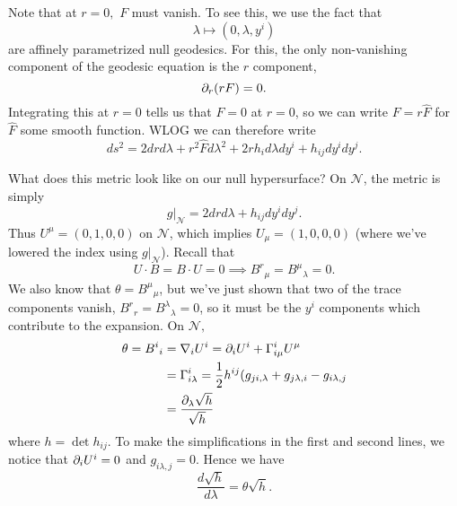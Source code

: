 Note that at $r=0,$ $F$ must vanish. To see this, we use the fact that
\begin{equation}
     \lambda\mapsto (0,\lambda,y^i)
\end{equation}
are affinely parametrized null geodesics. For this, the only non-vanishing component of the geodesic equation is the $r$ component,
\begin{equation}
    \partial_r (rF)=0.
\end{equation}
Integrating this at $r=0$ tells us that $F=0$ at $r=0$, so we can write $F=r\hat F$ for $\hat F$ some smooth function. WLOG we can therefore write
\begin{equation}
    ds^2 = 2drd\lambda +r^2 \hat F d\lambda^2 +2rh_i d\lambda dy^i + h_{ij} dy^i dy^j.
\end{equation}

What does this metric look like on our null hypersurface? On $\mathcal{N}$, the metric is simply
\begin{equation}\label{nullhsurfacemetric}
    g|_{\mathcal{N}}= 2drd\lambda +h_{ij} dy^i dy^j.
\end{equation}
Thus $U^\mu=(0,1,0,0)$ on $\mathcal{N}$, which implies $U_\mu=(1,0,0,0)$ (where we've lowered the index using $g|_{\mathcal{N}}$). Recall that 
\begin{equation}
    U\cdot B = B\cdot U=0 \implies B^r{}_\mu = B^\mu{}_\lambda = 0.
\end{equation}
We also know that $\theta=B^\mu{}_\mu$, but we've just shown that two of the trace components vanish, $B^r{}_r=B^\lambda{}_\lambda=0$, so it must be the $y^i$ components which contribute to the expansion. On $\mathcal{N},$
\begin{align}
    \theta = B^i{}_i &=\nabla_i U^i = \partial_i U^i +\Gamma^i_{i\mu} U^\mu\\
    &= \Gamma^i_{i \lambda} =\frac{1}{2} h^{ij}(g_{ji,\lambda} + g_{j\lambda,i}-g_{i\lambda,j}\\
    &= \frac{\partial_\lambda\sqrt{h}}{\sqrt{h}}
\end{align}
where $h=\det h_{ij}$. To make the simplifications in the first and second lines, we notice that $\partial_i U^i=0$ and $g_{i\lambda,j}=0$. Hence we have
\begin{equation}
    \frac{d\sqrt{h}}{d\lambda} = \theta \sqrt{h}.
\end{equation}

